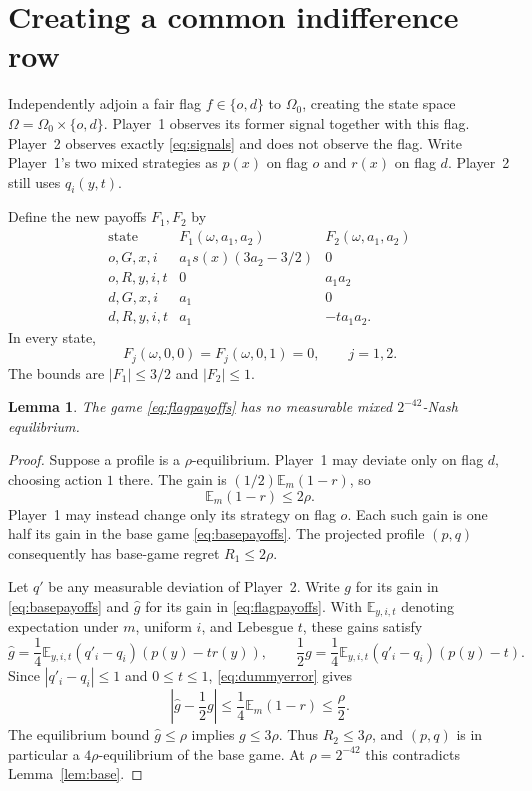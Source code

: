 \documentclass[11pt]{article}
\newtheorem{lemma}[theorem]{Lemma}
\theoremstyle{remark}
\newcommand{\E}{\mathbb E}
\begin{document}
\section{Creating a common indifference row}

Independently adjoin a fair flag $f\in\{o,d\}$ to $\Omega_0$,
creating the state space $\Omega=\Omega_0\times\{o,d\}$.
Player~1 observes its former signal together with this flag. Player~2
observes exactly \eqref{eq:signals} and does not observe the flag.
Write Player~1's two mixed strategies as $p(x)$ on flag $o$ and
$r(x)$ on flag $d$. Player~2 still uses $q_i(y,t)$.

Define the new payoffs $F_1,F_2$ by
\begin{equation}\label{eq:flagpayoffs}
\begin{array}{c|cc}
 \text{state}&F_1(\omega,a_1,a_2)&F_2(\omega,a_1,a_2)\\ \hline
 o,G,x,i&a_1s(x)(3a_2-3/2)&0\\
 o,R,y,i,t&0&a_1a_2\\
 d,G,x,i&a_1&0\\
 d,R,y,i,t&a_1&-ta_1a_2.
\end{array}
\end{equation}
In every state,
\begin{equation}\label{eq:rowzero}
 F_j(\omega,0,0)=F_j(\omega,0,1)=0,\qquad j=1,2.
\end{equation}
The bounds are $|F_1|\le3/2$ and $|F_2|\le1$.

\begin{lemma}\label{lem:flag}
The game \eqref{eq:flagpayoffs} has no measurable mixed
$2^{-42}$-Nash equilibrium.
\end{lemma}
\begin{proof}
Suppose a profile is a $\rho$-equilibrium. Player~1 may deviate only
on flag $d$, choosing action $1$ there. The gain is
$(1/2)\E_m(1-r)$, so
\begin{equation}\label{eq:dummyerror}
 \E_m(1-r)\le2\rho.
\end{equation}
Player~1 may instead change only its strategy on flag $o$. Each such
gain is one half its gain in the base game
\eqref{eq:basepayoffs}. The projected profile $(p,q)$ consequently
has base-game regret $R_1\le2\rho$.

Let $q'$ be any measurable deviation of Player~2. Write $g$ for its
gain in \eqref{eq:basepayoffs} and $\widehat g$ for its gain in
\eqref{eq:flagpayoffs}. With $\E_{y,i,t}$ denoting expectation under
$m$, uniform $i$, and Lebesgue $t$, these gains satisfy
\[
 \widehat g=\frac14\E_{y,i,t}
       (q'_i-q_i)(p(y)-t r(y)),\qquad
 \frac12g=\frac14\E_{y,i,t}
       (q'_i-q_i)(p(y)-t).
\]
Since $|q'_i-q_i|\le1$ and $0\le t\le1$,
\eqref{eq:dummyerror} gives
\[
 \left|\widehat g-\frac12g\right|
 \le\frac14\E_m(1-r)\le\frac\rho2.
\]
The equilibrium bound $\widehat g\le\rho$ implies $g\le3\rho$.
Thus $R_2\le3\rho$, and $(p,q)$ is in particular a
$4\rho$-equilibrium of the base game. At $\rho=2^{-42}$ this
contradicts Lemma~\ref{lem:base}.
\end{proof}
\end{document}
